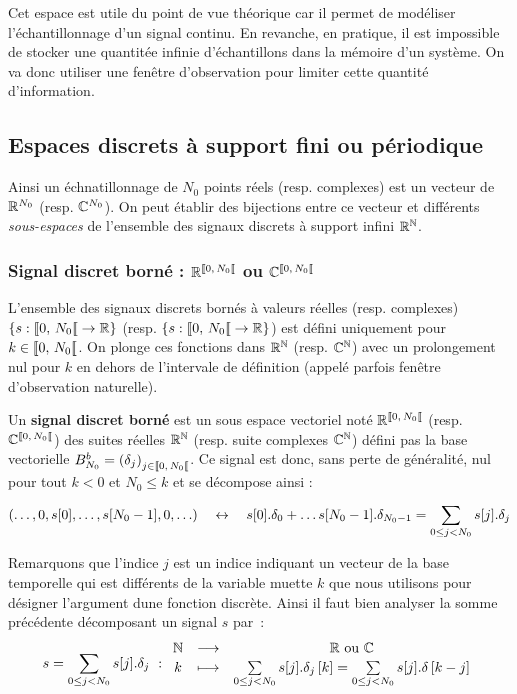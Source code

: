 Cet espace est utile du point de vue théorique car il permet de
modéliser l'échantillonnage d'un signal continu. En revanche, en
pratique, il est impossible de stocker une quantitée infinie
d'échantillons dans la mémoire d'un système. On va donc utiliser une
fenêtre d'observation pour limiter cette quantité d'information.


\subsection{Espaces discrets à support fini ou périodique}
Ainsi un échnatillonnage de $N_0$ points réels (resp. complexes) est
un vecteur de $\mathbb{R}^{N_0}$ (resp. $\mathbb{C}^{N_0}$). On peut établir des bijections
entre ce vecteur et différents \emph{sous-espaces} de l'ensemble des signaux
discrets à support infini $\mathbb{R}^{\mathbb{N}}$.



\subsubsection{Signal discret borné :  $\RNborne$ ou $\CNborne$}
L'ensemble des signaux discrets bornés à valeurs réelles (resp. complexes) $\left\{s : \SN0 \to \R \right\}$ (resp. $\left\{s : \SN0 \to \R \right\}$) est défini uniquement pour $k\in\SN0$. On plonge ces fonctions dans $\mathbb{R}^{\mathbb{N}}$ (resp. $\mathbb{C}^{\mathbb{N}}$) avec un prolongement nul pour $k$ en dehors de l'intervale de définition (appelé parfois fenêtre d'observation naturelle).

\begin{definition}
  \label{def:signal_discret_borne}
  Un \textbf{signal discret borné} est un sous espace vectoriel noté
  $\RNborne$ (resp. $\CNborne$) des suites réelles $\mathbb{R}^{\mathbb{N}}$ (resp. suite
  complexes $\mathbb{C}^{\mathbb{N}}$) défini pas la base vectorielle
  $B_{N_0}^b=\left(\delta_j\right)_{j\in\SN0}$. Ce signal est donc, sans perte de
  généralité, nul pour tout $k<0$ et $ N_0\leq k$ et se décompose ainsi
  :
  \begin{equation}
    (\ldots,0, s[0], \dots, s[N_0-1], 0, \ldots) \quad \leftrightarrow \quad s[0].\delta_0 + \dots s[N_0-1].\delta_{N_0-1} = \sum\limits_{0\leq j< N_0}^{}{s[j].\delta_j}
  \end{equation}
\end{definition}

Remarquons que l'indice $j$ est un indice indiquant un vecteur de la
base temporelle qui est différents de la variable muette $k$ que nous
utilisons pour désigner l'argument dune fonction discrète. Ainsi il
faut bien analyser la somme précédente décomposant un signal $s$ par~:
\begin{equation}
  s = \sum\limits_{0\leq j< N_0}^{}{s[j].\delta_j}~: \begin{array}{ccc} \mathbb{N} & \longrightarrow & \mathbb{R} \text{ ou } \mathbb{C} \\ k & \longmapsto & \sum\limits_{0\leq j< N_0}^{}{s[j].\delta_j\left[k\right]}={\sum\limits_{0\leq j< N_0}^{}{s[j].\delta\left[k-j\right]}} \\ \end{array}
\end{equation}

